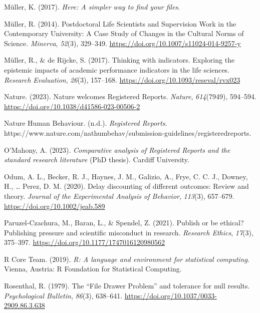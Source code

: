 \documentclass[
  british,
  a4paper,
  ,man,mask,floatsintext]{apa6}
\newlength{\cslhangindent}
\newenvironment{CSLReferences}[2] %
 {\begin{list}{}{%
  \setlength{\itemindent}{0pt}
  \setlength{\leftmargin}{0pt}
  \setlength{\parsep}{0pt}
  \ifodd #1
   \setlength{\leftmargin}{\cslhangindent}
   \setlength{\itemindent}{-1\cslhangindent}
  \fi
  \setlength{\itemsep}{#2\baselineskip}}}
 {\end{list}}
\begin{document}
\begin{CSLReferences}{1}{0}
Müller, K. (2017). \emph{Here: {A} simpler way to find your files}.

Müller, R. (2014). Postdoctoral {Life Scientists} and {Supervision Work} in the {Contemporary University}: {A Case Study} of {Changes} in the {Cultural Norms} of {Science}. \emph{Minerva}, \emph{52}(3), 329--349. \url{https://doi.org/10.1007/s11024-014-9257-y}

Müller, R., \& de Rijcke, S. (2017). Thinking with indicators. {Exploring} the epistemic impacts of academic performance indicators in the life sciences. \emph{Research Evaluation}, \emph{26}(3), 157--168. \url{https://doi.org/10.1093/reseval/rvx023}

Nature. (2023). Nature welcomes {Registered Reports}. \emph{Nature}, \emph{614}(7949), 594--594. \url{https://doi.org/10.1038/d41586-023-00506-2}

Nature Human Behaviour. (n.d.). \emph{Registered {Reports}}. https://www.nature.com/nathumbehav/submission-guidelines/registeredreports.

O'Mahony, A. (2023). \emph{Comparative analysis of {Registered Reports} and the standard research literature} (PhD thesis). Cardiff University.

Odum, A. L., Becker, R. J., Haynes, J. M., Galizio, A., Frye, C. C. J., Downey, H., \ldots{} Perez, D. M. (2020). Delay discounting of different outcomes: {Review} and theory. \emph{Journal of the Experimental Analysis of Behavior}, \emph{113}(3), 657--679. \url{https://doi.org/10.1002/jeab.589}

Paruzel-Czachura, M., Baran, L., \& Spendel, Z. (2021). Publish or be ethical? {Publishing} pressure and scientific misconduct in research. \emph{Research Ethics}, \emph{17}(3), 375--397. \url{https://doi.org/10.1177/1747016120980562}

R Core Team. (2019). \emph{R: {A} language and environment for statistical computing}. Vienna, Austria: R Foundation for Statistical Computing.

Rosenthal, R. (1979). The {``{File Drawer Problem}''} and tolerance for null results. \emph{Psychological Bulletin}, \emph{86}(3), 638--641. \url{https://doi.org/10.1037/0033-2909.86.3.638}


\end{CSLReferences}
\end{document}
